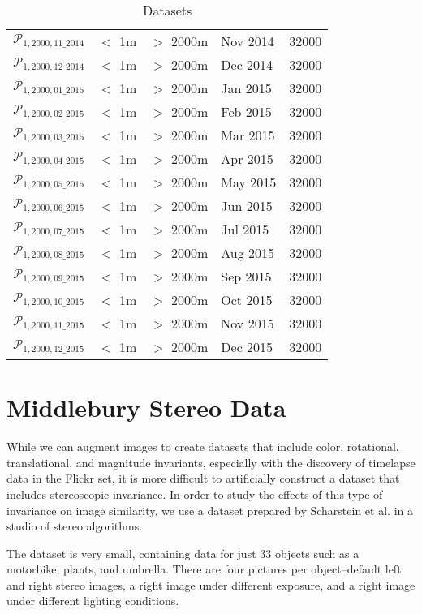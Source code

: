 \begin{table}
\begin{tabular}{c >{\centering\arraybackslash}m{3.2cm} >{\centering\arraybackslash}m{3cm} >{\centering\arraybackslash}m{2cm} c}
		$\mathcal{P}_{1,2000,11\_2014}$ & $<$ 1m & $>$ 2000m & Nov 2014  & 32000\\
		$\mathcal{P}_{1,2000,12\_2014}$ & $<$ 1m & $>$ 2000m & Dec 2014  & 32000\\
		$\mathcal{P}_{1,2000,01\_2015}$ & $<$ 1m & $>$ 2000m & Jan 2015  & 32000\\
		$\mathcal{P}_{1,2000,02\_2015}$ & $<$ 1m & $>$ 2000m & Feb 2015  & 32000\\
		$\mathcal{P}_{1,2000,03\_2015}$ & $<$ 1m & $>$ 2000m & Mar 2015  & 32000\\
		$\mathcal{P}_{1,2000,04\_2015}$ & $<$ 1m & $>$ 2000m & Apr 2015  & 32000\\
		$\mathcal{P}_{1,2000,05\_2015}$ & $<$ 1m & $>$ 2000m & May 2015  & 32000\\
		$\mathcal{P}_{1,2000,06\_2015}$ & $<$ 1m & $>$ 2000m & Jun 2015  & 32000\\
		$\mathcal{P}_{1,2000,07\_2015}$ & $<$ 1m & $>$ 2000m & Jul 2015  & 32000\\
		$\mathcal{P}_{1,2000,08\_2015}$ & $<$ 1m & $>$ 2000m & Aug 2015  & 32000\\
		$\mathcal{P}_{1,2000,09\_2015}$ & $<$ 1m & $>$ 2000m & Sep 2015  & 32000\\
		$\mathcal{P}_{1,2000,10\_2015}$ & $<$ 1m & $>$ 2000m & Oct 2015  & 32000\\
		$\mathcal{P}_{1,2000,11\_2015}$ & $<$ 1m & $>$ 2000m & Nov 2015  & 32000\\
		$\mathcal{P}_{1,2000,12\_2015}$ & $<$ 1m & $>$ 2000m & Dec 2015  & 32000\\
		\bottomrule
	\end{tabular}
	\caption{Datasets}
	\label{table:datasets}
\end{table}


\section{Middlebury Stereo Data}
While we can augment images to create datasets that include color, rotational, translational, and magnitude invariants, especially with the discovery of timelapse data in the Flickr set, it is more difficult to artificially construct a dataset that includes stereoscopic invariance. In order to study the effects of this type of invariance on image similarity, we use a dataset prepared by Scharstein et al. in a studio of stereo algorithms.\cite{scharstein2014high}

The dataset is very small, containing data for just 33 objects such as a motorbike, plants, and umbrella. There are four pictures per object--default left and right stereo images, a right image under different exposure, and a right image under different lighting conditions.

